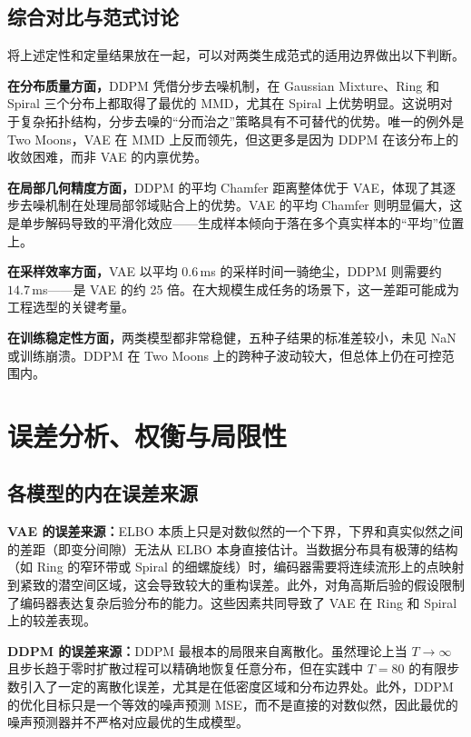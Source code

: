 \documentclass[UTF8,a4paper,12pt]{ctexart}
\begin{document}
\subsection{综合对比与范式讨论}

将上述定性和定量结果放在一起，可以对两类生成范式的适用边界做出以下判断。

\textbf{在分布质量方面，}DDPM 凭借分步去噪机制，在 Gaussian Mixture、Ring 和 Spiral 三个分布上都取得了最优的 MMD，尤其在 Spiral 上优势明显。这说明对于复杂拓扑结构，分步去噪的“分而治之”策略具有不可替代的优势。唯一的例外是 Two Moons，VAE 在 MMD 上反而领先，但这更多是因为 DDPM 在该分布上的收敛困难，而非 VAE 的内禀优势。

\textbf{在局部几何精度方面，}DDPM 的平均 Chamfer 距离整体优于 VAE，体现了其逐步去噪机制在处理局部邻域贴合上的优势。VAE 的平均 Chamfer 则明显偏大，这是单步解码导致的平滑化效应——生成样本倾向于落在多个真实样本的“平均”位置上。

\textbf{在采样效率方面，}VAE 以平均 $0.6$\,ms 的采样时间一骑绝尘，DDPM 则需要约 $14.7$\,ms——是 VAE 的约 25 倍。在大规模生成任务的场景下，这一差距可能成为工程选型的关键考量。

\textbf{在训练稳定性方面，}两类模型都非常稳健，五种子结果的标准差较小，未见 NaN 或训练崩溃。DDPM 在 Two Moons 上的跨种子波动较大，但总体上仍在可控范围内。

\section{误差分析、权衡与局限性}

\subsection{各模型的内在误差来源}

\textbf{VAE 的误差来源：}ELBO 本质上只是对数似然的一个下界，下界和真实似然之间的差距（即变分间隙）无法从 ELBO 本身直接估计。当数据分布具有极薄的结构（如 Ring 的窄环带或 Spiral 的细螺旋线）时，编码器需要将连续流形上的点映射到紧致的潜空间区域，这会导致较大的重构误差。此外，对角高斯后验的假设限制了编码器表达复杂后验分布的能力。这些因素共同导致了 VAE 在 Ring 和 Spiral 上的较差表现。

\textbf{DDPM 的误差来源：}DDPM 最根本的局限来自离散化。虽然理论上当 $T\to\infty$ 且步长趋于零时扩散过程可以精确地恢复任意分布，但在实践中 $T=80$ 的有限步数引入了一定的离散化误差，尤其是在低密度区域和分布边界处。此外，DDPM 的优化目标只是一个等效的噪声预测 MSE，而不是直接的对数似然\cite{lai2025principles}，因此最优的噪声预测器并不严格对应最优的生成模型。
\end{document}
